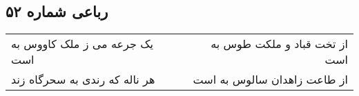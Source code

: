 \begin{center}
\section*{رباعی شماره ۵۲}
\label{sec:sh052}
\begin{longtable}{l p{0.5cm} r}
یک جرعه می ز ملک کاووس به است
&&
از تخت قباد و ملکت طوس به است
\\
هر ناله که رندی به سحرگاه زند
&&
از طاعت زاهدان سالوس به است
\\
\end{longtable}
\end{center}

